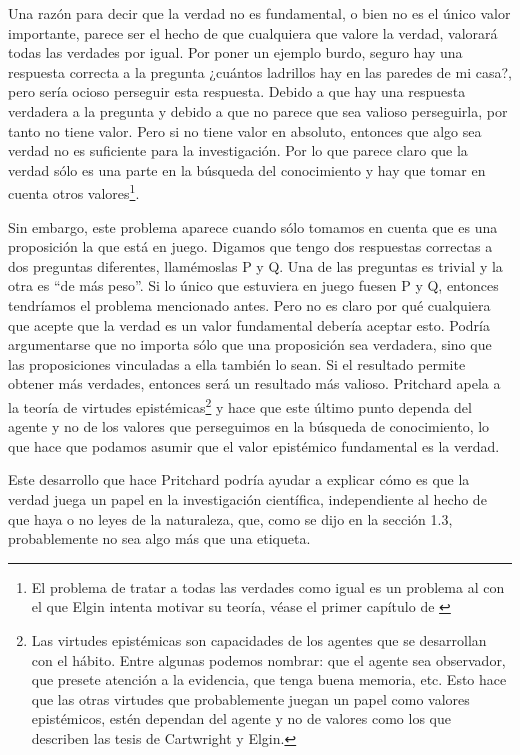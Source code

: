 Una razón para decir que la verdad no es fundamental, o bien no es el único valor importante, parece ser el hecho de que cualquiera que valore la verdad, valorará todas las verdades por igual. Por poner un ejemplo burdo, seguro hay una respuesta correcta a la pregunta ¿cuántos ladrillos hay en las paredes de mi casa?, pero sería ocioso perseguir esta respuesta. Debido a que hay una respuesta verdadera a la pregunta y debido a que no parece que sea valioso perseguirla, por tanto no tiene valor. Pero si no tiene valor en absoluto, entonces que algo sea verdad no es suficiente para la investigación. Por lo que parece claro que la verdad sólo es una parte en la búsqueda del conocimiento y hay que tomar en cuenta otros valores\footnote{El problema de tratar a todas las verdades como igual es un problema al con el que Elgin intenta motivar su teoría, véase el primer capítulo de \cite{Elgin2017}}.

Sin embargo, este problema aparece cuando sólo tomamos en cuenta que es una proposición la que está en juego. Digamos que tengo dos respuestas correctas a dos preguntas diferentes, llamémoslas P y Q. Una de las preguntas es trivial y la otra es ``de más peso''. Si lo único que estuviera en juego fuesen P y Q, entonces tendríamos el problema mencionado antes. Pero no es claro por qué cualquiera que acepte que la verdad es un valor fundamental debería aceptar esto. Podría argumentarse que no importa sólo que una proposición sea verdadera, sino que las proposiciones vinculadas a ella también lo sean. Si el resultado permite obtener más verdades, entonces será un resultado más valioso. Pritchard apela a la teoría de virtudes epistémicas\footnote{Las virtudes epistémicas son capacidades de los agentes que se desarrollan con el hábito. Entre algunas podemos nombrar: que el agente sea observador, que presete atención a la evidencia, que tenga buena memoria, etc. Esto hace que las otras virtudes que probablemente juegan un papel como valores epistémicos, estén dependan del agente y no de valores como los que describen las tesis de Cartwright y Elgin.} y hace que este último punto dependa del agente y no de los valores que perseguimos en la búsqueda de conocimiento, lo que hace que podamos asumir que el valor epistémico fundamental es la verdad.

Este desarrollo que hace Pritchard podría ayudar a explicar cómo es que la verdad juega un papel en la investigación científica, independiente al hecho de que haya o no leyes de la naturaleza, que, como se dijo en la sección 1.3, probablemente no sea algo más que una etiqueta.



